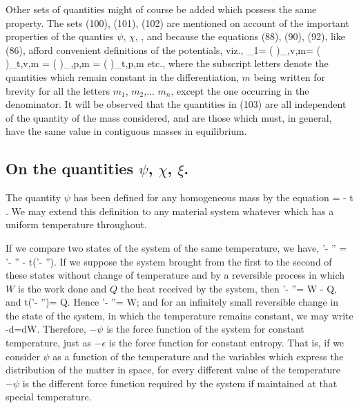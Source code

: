 \documentclass[12pt]{article}
\begin{document}
Other sets of quantities might of course be added which possess the same property. The sets (100), (101), (102) are mentioned on account of the important properties of the quanties $\psi$, $\chi$,  , and because the equations (88), (90), (92), like (86), afford convenient definitions of the potentials, viz.,
\eqs \mu_1= \left(  \right)_{\eta,v,m}= 
\left(  \right)_{t,v,m} = 
\left(  \right)_{\eta,p,m} = 
\left(  \right)_{t,p,m}  
\label{104}\eqe
etc., where the subscript letters denote the quantities which remain constant in the differentiation, $m$ being written for brevity for all the letters $m_1$, $m_2$,... $m_n$, except the one occurring in the denominator. It will be observed that the quantities in (103) are all independent of the quantity of the mass considered, and are those which must, in general, have the same value in contiguous masses in equilibrium.

\subsection{On the quantities $\psi$, $\chi$, $\xi$.}
The quantity $\psi$ has been defined for any homogeneous mass by the
equation
\eqs \psi = \epsilon - t \eta. \label{105}\eqe
We may extend this definition to any material system whatever which has a uniform temperature throughout.

If we compare two states of the system of the same temperature, we have, 
\eqs \psi'- \psi'' = \epsilon'- \epsilon'' - t(\eta'- \eta''). \label{106}\eqe
If we suppose the system brought from the first to the second of these states without change of temperature and by a reversible process in which $W$ is the work done and $Q$ the heat received by the system, then
\eqs \epsilon'- \epsilon''= W - Q, \label{107}\eqe
and   \eqs         t(\eta'- \eta'')= Q. \label{108}\eqe
Hence  \eqs         \psi'- \psi''= W;  \label{109}\eqe
and for an infinitely small reversible change in the state of the system, in which the temperature remains constant, we may write
\eqs -d\psi=dW. \label{110}\eqe
Therefore, $-\psi$  is the force function of the system for constant temperature, just as $-\epsilon$ is the force function for constant entropy. That is, if we consider $\psi$ as a function of the temperature and the variables which express the distribution of the matter in space, for every different value of the temperature $-\psi$ is the different force function required by the system if maintained at that special temperature.
\end{document}
